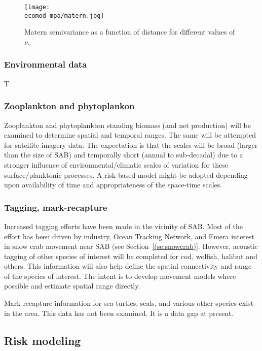 \documentclass[letterpaper,portrait,11pt]{scrartcl}
\numberwithin{equation}{section}		%
\numberwithin{figure}{section}			%
\numberwithin{table}{section}				%
\newcommand{\ecomod}{\string~/ecomod_data/}   %
\begin{document}
\begin{figure}
  \label{fig:matern}
  \centering
  \texttt{[image: \\ecomod mpa/matern.jpg]}
  \caption{Matern semivariance as a function of distance for different values of $\nu$.}
\end{figure}

\subsubsection{Environmental data}

T

\subsubsection{Zooplankton and phytoplankon}

Zooplankton and phytoplankton standing biomass (and net production) will be examined to determine spatial and temporal ranges. The same will be attempted for satellite imagery data. The expectation is that the scales will be broad (larger than the size of SAB) and temporally short (annual to sub-decadal) due to a stronger influence of environmental/climatic scales of variation for these surface/planktonic processes. A risk-based model might be adopted depending upon availability of time and appropriateness of the space-time scales.

\subsubsection{Tagging, mark-recapture}
Increased tagging efforts have been made in the vicinity of SAB. Most of the effort has been driven by industry, Ocean Tracking Network, and Emera interest in snow crab movement near SAB (see Section~\ref{(se:snowcrab)}. However, acoustic tagging of other species of interest will be completed for cod, wolfish, halibut and others. This information will also help define the spatial connectivity and range of the species of interest. The intent is to develop movement models where possible and estimate spatial range directly.  

Mark-recapture information for sea turtles, seals, and various other species exist in the area. This data has not been examined. It is a data gap at present. 




\subsection{Risk modeling}
\label{sec:riskapproach}
\end{document}
